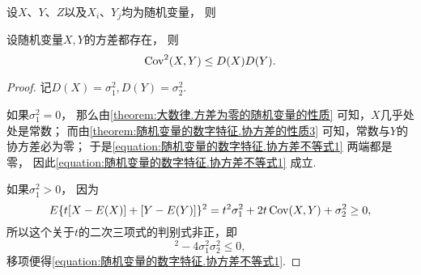 \begin{property}\label{theorem:随机变量的数字特征.协方差的性质3}
设\(X\)、\(Y\)、\(Z\)以及\(X_i\)、\(Y_j\)均为随机变量，
则
\end{property}

\begin{theorem}
设随机变量\(X,Y\)的方差都存在，
则\begin{equation}\label{equation:随机变量的数字特征.协方差不等式1}
    \operatorname{Cov}^2(X,Y) \leq D(X) D(Y).
\end{equation}
\begin{proof}
记\(D(X) = \sigma_1^2,
D(Y) = \sigma_2^2\).

如果\(\sigma_1^2=0\)，
那么由\cref{theorem:大数律.方差为零的随机变量的性质} 可知，\(X\)几乎处处是常数；
而由\cref{theorem:随机变量的数字特征.协方差的性质3} 可知，常数与\(Y\)的协方差必为零；
于是\cref{equation:随机变量的数字特征.协方差不等式1} 两端都是零，
因此\cref{equation:随机变量的数字特征.协方差不等式1} 成立.

如果\(\sigma_1^2>0\)，
因为\begin{equation*}
	E\{t[X-E(X)]+[Y-E(Y)]\}^2
	= t^2 \sigma_1^2
	+ 2t \operatorname{Cov}(X,Y)
	+ \sigma_2^2
	\geq 0,
\end{equation*}
所以这个关于\(t\)的二次三项式的判别式非正，即\begin{equation*}
	[2\Cov(X,Y)]^2 - 4 \sigma_1^2 \sigma_2^2 \leq 0,
\end{equation*}
移项便得\cref{equation:随机变量的数字特征.协方差不等式1}.
\end{proof}
\end{theorem}

